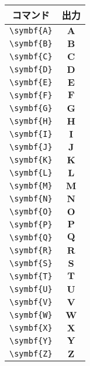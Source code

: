 \begin{figure}[htbp]
    \centering
    \begin{subfigure}{.5\textwidth}
        \centering
        \begin{tabular}{cc}
            \toprule
            コマンド         & 出力          \\
            \midrule
            \verb|\symbf{A}| & \(\symbf{A}\) \\
            \verb|\symbf{B}| & \(\symbf{B}\) \\
            \verb|\symbf{C}| & \(\symbf{C}\) \\
            \verb|\symbf{D}| & \(\symbf{D}\) \\
            \verb|\symbf{E}| & \(\symbf{E}\) \\
            \verb|\symbf{F}| & \(\symbf{F}\) \\
            \verb|\symbf{G}| & \(\symbf{G}\) \\
            \verb|\symbf{H}| & \(\symbf{H}\) \\
            \verb|\symbf{I}| & \(\symbf{I}\) \\
            \verb|\symbf{J}| & \(\symbf{J}\) \\
            \verb|\symbf{K}| & \(\symbf{K}\) \\
            \verb|\symbf{L}| & \(\symbf{L}\) \\
            \verb|\symbf{M}| & \(\symbf{M}\) \\
            \verb|\symbf{N}| & \(\symbf{N}\) \\
            \verb|\symbf{O}| & \(\symbf{O}\) \\
            \verb|\symbf{P}| & \(\symbf{P}\) \\
            \verb|\symbf{Q}| & \(\symbf{Q}\) \\
            \verb|\symbf{R}| & \(\symbf{R}\) \\
            \verb|\symbf{S}| & \(\symbf{S}\) \\
            \verb|\symbf{T}| & \(\symbf{T}\) \\
            \verb|\symbf{U}| & \(\symbf{U}\) \\
            \verb|\symbf{V}| & \(\symbf{V}\) \\
            \verb|\symbf{W}| & \(\symbf{W}\) \\
            \verb|\symbf{X}| & \(\symbf{X}\) \\
            \verb|\symbf{Y}| & \(\symbf{Y}\) \\
            \verb|\symbf{Z}| & \(\symbf{Z}\) \\

\end{tabular}
\end{subfigure}
\end{figure}
